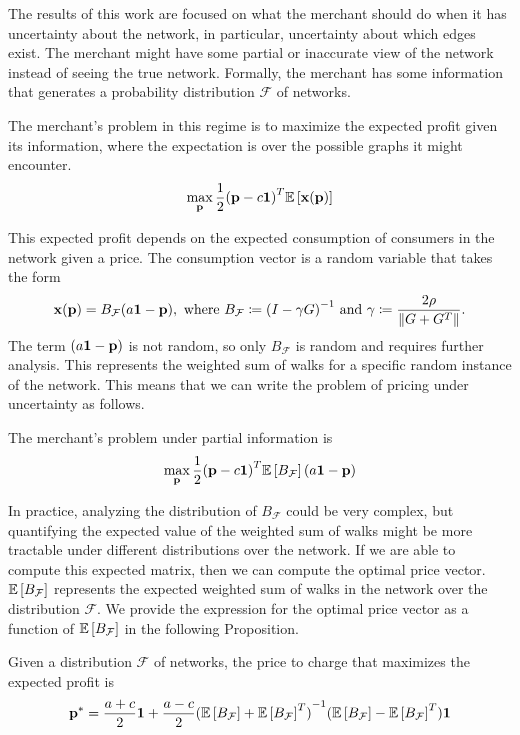 The results of this work are focused on what the merchant should do when it has uncertainty about the network, in particular, uncertainty about which edges exist. The merchant might have some partial or inaccurate view of the network instead of seeing the true network. Formally, the merchant has some information that generates a probability distribution $\mathcal{F}$ of networks. 

The merchant's problem in this regime is to maximize the expected profit given its information, where the expectation is over the possible graphs it might encounter. 
\begin{align}
        \max_{\mathbf{p}}  \frac{1}{2}  {\left(\mathbf{p} - c \mathbf{1} \right)}^T \mathbb{E}\left[ \mathbf{x}(\mathbf{p})\right]
\end{align}


This expected profit depends on the expected consumption of consumers in the network given a price. The consumption vector is a random variable that takes the form \[\mathbf{x}(\mathbf{p}) = B_\mathcal{F} (a\mathbf{1} -\mathbf{p}), \mbox{ where } B_\mathcal{F} \coloneqq {\left(I - \gamma G \right)}^{-1} \mbox{ and } \gamma \coloneqq \frac{2\rho}{\|G + G^T\|}.\] The term $(a\mathbf{1} -\mathbf{p})$ is not random, so only $B_\mathcal{F}$ is random and requires further analysis. This represents the weighted sum of walks for a specific random instance of the network. This means that we can write the problem of pricing under uncertainty as follows.

\begin{definition}
    The merchant's problem under partial information is \[\max_{\mathbf{p}}  \frac{1}{2}  {\left(\mathbf{p} - c \mathbf{1} \right)}^T
    \mathbb{E}\left[ B_\mathcal{F}\right] (a\mathbf{1} -\mathbf{p})\]
\end{definition}

In practice, analyzing the distribution of $B_\mathcal{F}$ could be very complex, but quantifying the expected value of the weighted sum of walks might be more tractable under different distributions over the network. If we are able to compute this expected matrix, then we can compute the optimal price vector. $\mathbb{E}\left[ B_\mathcal{F}\right]$ represents the expected weighted sum of walks in the network over the distribution $\mathcal{F}$.  We provide the expression for the optimal price vector as a function of $\mathbb{E}\left[ B_\mathcal{F}\right]$ in the following Proposition.


\begin{proposition}\label{prop-info-price}
    Given a distribution $\mathcal{F}$ of networks, the price to charge that maximizes the expected profit is
    \begin{align*}
        \mathbf{p}^* = \frac{a+c}{2} \mathbf{1} + \frac{a-c}{2} {(\mathbb{E}\left[ B_\mathcal{F}\right] + \mathbb{E}\left[ B_\mathcal{F}\right]^T)}^{-1} (\mathbb{E}\left[ B_\mathcal{F}\right] - \mathbb{E}\left[ B_\mathcal{F}\right]^T) \mathbf{1}
  \end{align*}
 \end{proposition}

